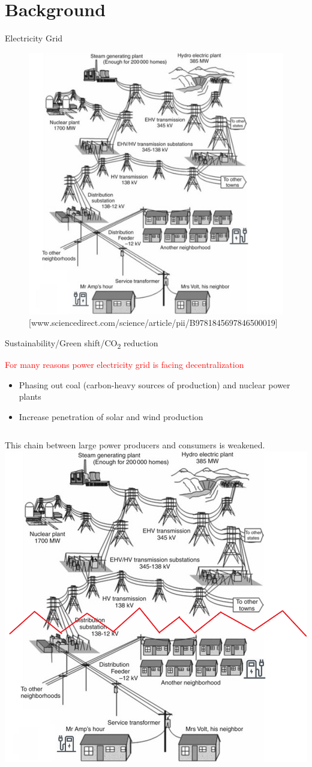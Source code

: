 \documentclass{beamer}
\begin{document}
\section{Background}
\begin{frame}{Electricity Grid}
\begin{figure}[!htbp]
\centering
\includegraphics[width=2.8 in , height=2.4 in]{Figures/EVchalendge1.png}
\caption{\tiny[www.sciencedirect.com/science/article/pii/B9781845697846500019]}
\end{figure}
\end{frame}






\begin{frame}{Sustainability/Green shift/CO\textsubscript{2} reduction}
\begin{alertblock}{\textcolor{red}{For many reasons power electricity grid is facing decentralization}}
\begin{itemize}
\item<1-> Phasing out coal (carbon-heavy sources of production) and nuclear power plants
\item<2-> Increase penetration of solar and wind production
\end{itemize}
\end{alertblock}
\begin{columns}
    This chain between large power producers and consumers is weakened.
\includegraphics[width=2 in , height=1.6 in]{Figures/EVchalendgebreak.png}
\end{columns}
\end{frame}
\end{document}
